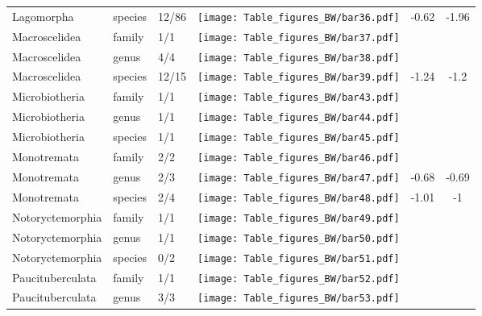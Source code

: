 \begin{longtable}{lL{1.8cm}C{2cm}lcc}
  Lagomorpha & species & 12/86 & \texttt{[image: Table\_figures\_BW/bar36.pdf]} & -0.62 & -1.96 \\ 
  Macroscelidea & family & 1/1 & \texttt{[image: Table\_figures\_BW/bar37.pdf]} &   &   \\ 
  Macroscelidea & genus & 4/4 & \texttt{[image: Table\_figures\_BW/bar38.pdf]} &   &   \\ 
  Macroscelidea & species & 12/15 & \texttt{[image: Table\_figures\_BW/bar39.pdf]} & -1.24 & -1.2 \\ 
  Microbiotheria & family & 1/1 & \texttt{[image: Table\_figures\_BW/bar43.pdf]} &   &   \\ 
  Microbiotheria & genus & 1/1 & \texttt{[image: Table\_figures\_BW/bar44.pdf]} &   &   \\ 
  Microbiotheria & species & 1/1 & \texttt{[image: Table\_figures\_BW/bar45.pdf]} &   &   \\ 
  Monotremata & family & 2/2 & \texttt{[image: Table\_figures\_BW/bar46.pdf]} &   &   \\ 
  Monotremata & genus & 2/3 & \texttt{[image: Table\_figures\_BW/bar47.pdf]} & -0.68 & -0.69 \\ 
  Monotremata & species & 2/4 & \texttt{[image: Table\_figures\_BW/bar48.pdf]} & -1.01 & -1 \\ 
  Notoryctemorphia & family & 1/1 & \texttt{[image: Table\_figures\_BW/bar49.pdf]} &   &   \\ 
  Notoryctemorphia & genus & 1/1 & \texttt{[image: Table\_figures\_BW/bar50.pdf]} &   &   \\ 
  Notoryctemorphia & species & 0/2 & \texttt{[image: Table\_figures\_BW/bar51.pdf]} &   &   \\ 
  Paucituberculata & family & 1/1 & \texttt{[image: Table\_figures\_BW/bar52.pdf]} &   &   \\ 
  Paucituberculata & genus & 3/3 & \texttt{[image: Table\_figures\_BW/bar53.pdf]} &   &   \\ 

\end{longtable}

